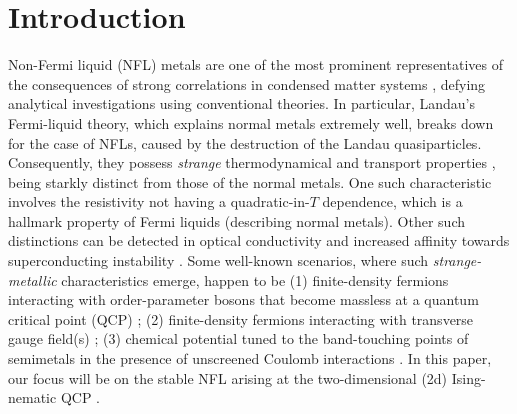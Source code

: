 \documentclass[aps, prb, onecolumn, nofootinbib, citeautoscript, 10pt]{revtex4-2}
\begin{document}
\tableofcontents

\section{Introduction}

Non-Fermi liquid (NFL) metals are one of the most prominent representatives of the consequences of strong correlations in condensed matter systems \cite{metlsach1, metlsach, olav, Lee-Dalid, ips-uv-ir1, ips-uv-ir2, ips-fflo, ips-nfl-u1,  metzner, ips-2kf, ips-cavity, ips-rafael, ips-cdw-moire}, defying analytical investigations using conventional theories. In particular, Landau's Fermi-liquid theory, which explains normal metals extremely well, breaks down for the case of NFLs, caused by the destruction of the Landau quasiparticles. Consequently, they possess \textit{strange} thermodynamical and transport properties \cite{ips-subir, ips-c2, ips-hermann, ips-hermann2, ips-hermann3, ips-hermann-review}, being starkly distinct from those of the normal metals. One such characteristic involves the resistivity not having a quadratic-in-$T$ dependence, which is a hallmark property of Fermi liquids (describing normal metals). Other such distinctions can be detected in optical conductivity \cite{ips-subir, ips-c2} and increased affinity towards superconducting instability \cite{ips2, ips-sc, ips-c2}. Some well-known scenarios, where such \textit{strange-metallic} characteristics emerge, happen to be (1) finite-density fermions interacting with order-parameter bosons that become massless at a quantum critical point (QCP) \cite{metlsach1, metlsach, Lee-Dalid,ips-uv-ir1, ips-uv-ir2, ips-fflo, ips-rafael, ips-2kf, ips-cavity}; (2) finite-density fermions interacting with transverse gauge field(s) \cite{olav, ips2, ips3, ips-nfl-u1}; (3) chemical potential tuned to the band-touching points of semimetals in the presence of unscreened Coulomb interactions \cite{Abrikosov, moon-xu, rahul-sid, ips-rahul, malcolm-bitan, ips-birefringent}. In this paper, our focus will be on the stable NFL arising at the two-dimensional (2d) Ising-nematic QCP \cite{metlsach1, metlsach, Lee-Dalid, ips-uv-ir1, ips-uv-ir2}.
\end{document}
